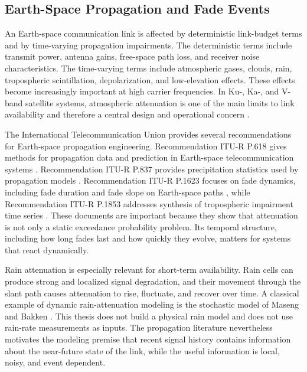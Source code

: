 \subsection{Earth-Space Propagation and Fade Events}
\label{sec:background-earth-space-attenuation}

An Earth-space communication link is affected by deterministic link-budget terms
and by time-varying propagation impairments. The deterministic terms include
transmit power, antenna gains, free-space path loss, and receiver noise
characteristics. The time-varying terms include atmospheric gases, clouds, rain,
tropospheric scintillation, depolarization, and low-elevation effects. These
effects become increasingly important at high carrier frequencies. In Ku-, Ka-,
and V-band satellite systems, atmospheric attenuation is one of the main limits
to link availability and therefore a central design and operational concern
\cite{panagopoulos2004satellite,ippolito2017rainFadeMitigation}.

The International Telecommunication Union provides several recommendations for
Earth-space propagation engineering. Recommendation ITU-R P.618 gives methods
for propagation data and prediction in Earth-space telecommunication systems
\cite{iturP618}. Recommendation ITU-R P.837 provides precipitation statistics
used by propagation models \cite{iturP837}. Recommendation ITU-R P.1623 focuses
on fade dynamics, including fade duration and fade slope on Earth-space paths
\cite{iturP1623}, while Recommendation ITU-R P.1853 addresses synthesis of
tropospheric impairment time series \cite{iturP1853}. These documents are
important because they show that attenuation is not only a static exceedance
probability problem. Its temporal structure, including how long fades last and
how quickly they evolve, matters for systems that react dynamically.

Rain attenuation is especially relevant for short-term availability. Rain cells
can produce strong and localized signal degradation, and their movement through
the slant path causes attenuation to rise, fluctuate, and recover over time. A
classical example of dynamic rain-attenuation modeling is the stochastic model
of Maseng and Bakken \cite{maseng1981stochastic}. This thesis does not build a
physical rain model and does not use rain-rate measurements as inputs. The
propagation literature nevertheless motivates the modeling premise that recent
signal history contains information about the near-future state of the link,
while the useful information is local, noisy, and event dependent.

